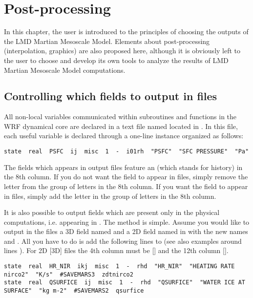 \chapter{Post-processing}\label{postproc}

\vk
In this chapter, the user is introduced to the principles of choosing the outputs of the LMD Martian Mesoscale Model. Elements about post-processing (interpolation, graphics) are also proposed here, although it is obviously left to the user to choose and develop its own tools to analyze the results of LMD Martian Mesoscale Model computations.

\mk
\section{Controlling which fields to output in  files}

\sk
All non-local variables communicated within subroutines and functions in the WRF dynamical core are declared in a text file named  located in . In this file, each useful variable is declared through a one-line instance organized as follows:

\scriptsize
\begin{verbatim}
state  real  PSFC  ij  misc  1  -  i01rh  "PSFC"  "SFC PRESSURE"  "Pa"
\end{verbatim}
\normalsize

\sk
The fields which appears in  output files feature an  (which stands for history) in the 8th column. If you do not want the field to appear in  files, simply remove the letter  from the group of letters in the 8th column. If you want the field to appear in  files, simply add the letter  in the group of letters in the 8th column.  

\sk
It is also possible to output fields which are present only in the physical computations, i.e. appearing in . The method is simple. Assume you would like to output in the  files a 3D field named  and a 2D field named  in  with the new names  and . All you have to do is add the following lines to  (see also examples around lines ). For 2D [3D] files the 4th column must be  [] and the 12th column  [].

\scriptsize
\begin{verbatim}
state  real  HR_NIR  ikj  misc  1  -  rhd  "HR_NIR"  "HEATING RATE nirco2"  "K/s"  #SAVEMARS3  zdtnirco2
state  real  QSURFICE  ij  misc  1  -  rhd  "QSURFICE"  "WATER ICE AT SURFACE"  "kg m-2"  #SAVEMARS2  qsurfice
\end{verbatim}
\normalsize

